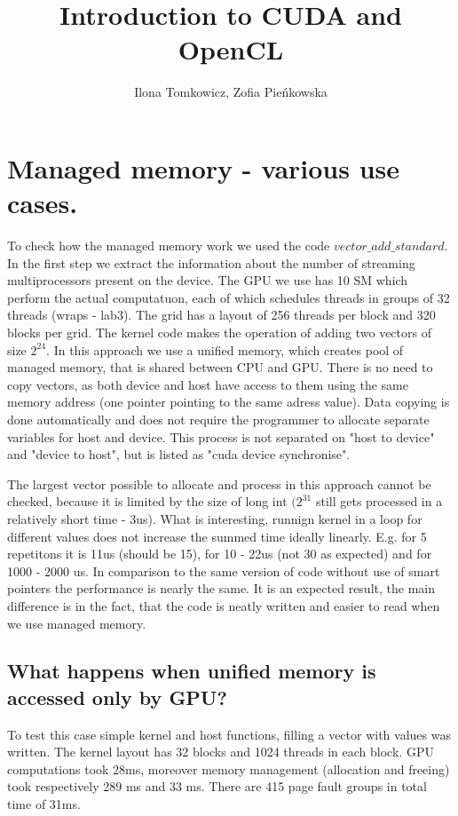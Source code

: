 \documentclass[12pt]{article}
\begin{document}
\title{Introduction to CUDA and OpenCL}
\author{Ilona Tomkowicz, Zofia Pieńkowska}

\maketitle
\tableofcontents
\newpage
\section{Managed memory - various use cases.} 
To check how the managed memory work we used the code $vector\_add\_standard$. In the first step we extract the information about the number of streaming multiprocessors present on the device. The GPU we use has 10 SM which perform the actual computatuon, each of which schedules threads in groups of 32 threads (wraps - lab3). The grid has a layout of 256 threads per block and 320 blocks per grid. The kernel code makes the operation of adding two vectors of size $2^{24}$. In this approach we use a unified memory, which creates pool of managed memory, that is shared between CPU and GPU. There is no need to copy vectors, as both device and host have access to them using the same memory address (one pointer pointing to the same adress value). Data copying is done automatically and does not require the programmer to allocate separate variables for host and device. This process is not separated on "host to device" and "device to host", but is listed as "cuda device synchronise".

The largest vector possible to allocate and process in this approach cannot be checked, because it is limited by the size of long int $(2^{31}$ still gets processed in a relatively short time - 3us). What is interesting, runnign kernel in a loop for different values does not increase the summed time ideally linearly. E.g. for 5 repetitons it is 11us (should be 15), for 10 - 22us (not 30 as expected) and for 1000 - 2000 us. In comparison to the same version of code without use of smart pointers the performance is nearly the same. It is an expected result, the main difference is in the fact, that the code is neatly written and easier to read when we use managed memory.

\subsection{What happens when unified memory is accessed only by GPU?}
To test this case simple kernel and host functions, filling a vector with values was written. The kernel layout has 32 blocks and 1024 threads in each block. GPU computations took 28ms, moreover memory management (allocation and freeing) took respectively 289 ms and 33 ms. There are 415 page fault groups in total time of 31ms.
\end{document}
